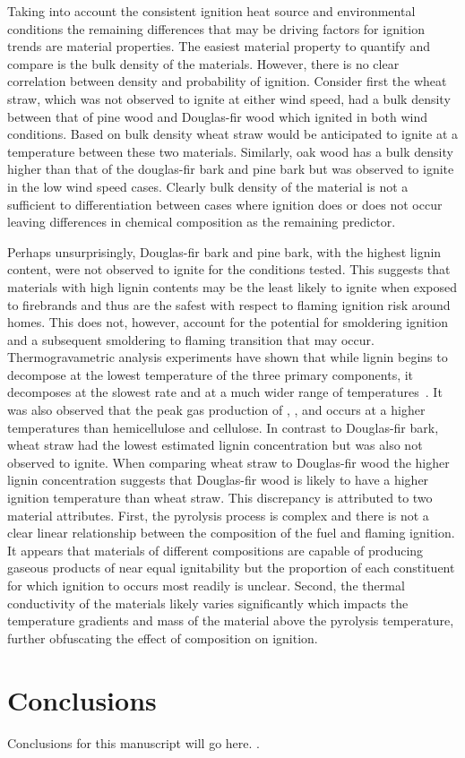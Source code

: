     Taking into account the consistent ignition heat source and environmental conditions the remaining differences that may be driving factors for ignition trends are material properties. 
    The easiest material property to quantify and compare is the bulk density of the materials. However, there is no clear correlation between density and probability of ignition. Consider first the wheat straw, which was not observed to ignite at either wind speed, had a bulk density between that of pine wood and Douglas-fir wood which ignited in both wind conditions. Based on bulk density wheat straw would be anticipated to ignite at a temperature between these two materials. Similarly, oak wood has a bulk density higher than that of the douglas-fir bark and pine bark but was observed to ignite in the low wind speed cases. Clearly bulk density of the material is not a sufficient to differentiation between cases where ignition does or does not occur leaving differences in chemical composition as the remaining predictor. 
    
    Perhaps unsurprisingly, Douglas-fir bark and pine bark, with the highest lignin content, were not observed to ignite for the conditions tested. This suggests that materials with high lignin contents may be the least likely to ignite when exposed to firebrands and thus are the safest with respect to flaming ignition risk around homes. This does not, however, account for the potential for smoldering ignition and a subsequent smoldering to flaming transition that may occur. Thermogravametric analysis experiments have shown that while lignin begins to decompose at the lowest temperature of the three primary components, it decomposes at the slowest rate and at a much wider range of temperatures~\cite{Yang2007a}. It was also observed that the peak gas production of , , and  occurs at a higher temperatures than hemicellulose and cellulose. In contrast to Douglas-fir bark, wheat straw had the lowest estimated lignin concentration but was also not observed to ignite. When comparing wheat straw to Douglas-fir wood the higher lignin concentration suggests that Douglas-fir wood is likely to have a higher ignition temperature than wheat straw. This discrepancy is attributed to two material attributes. First, the pyrolysis process is complex and there is not a clear linear relationship between the composition of the fuel and flaming ignition. It appears that materials of different compositions are capable of producing gaseous products of near equal ignitability but the proportion of each constituent for which ignition to occurs most readily is unclear. Second, the thermal conductivity of the materials likely varies significantly which impacts the temperature gradients and mass of the material above the pyrolysis temperature, further obfuscating the effect of composition on ignition. 
    
    \section{Conclusions}
    \label{sec:conclusions3}
    Conclusions for this manuscript will go here.
    \cite{MacLean1941}.
    

    
   